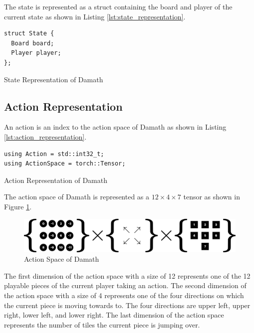 The state is represented as a struct containing the board and player of the current state as shown in Listing \ref{lst:state_representation}.

\begin{listing}[htb]
\begin{verbatim}
struct State {
  Board board;
  Player player;
};
\end{verbatim}
\caption{State Representation of Damath}
\label{lst:state_representation}
\end{listing}

\clearpage

\subsection{Action Representation}

An action is an index to the action space of Damath as shown in Listing \ref{lst:action_representation}.

\begin{listing}[htb]
\begin{verbatim}
using Action = std::int32_t;
using ActionSpace = torch::Tensor;
\end{verbatim}
\caption{Action Representation of Damath}
\label{lst:action_representation}
\end{listing}

The action space of Damath is represented as a $12 \times 4 \times 7$ tensor as shown in Figure \ref{fig:action_space}.

\begin{figure}[htb]
    \centering
    \includegraphics[width=0.7\linewidth]{images/action_space.png}
    \caption{Action Space of Damath}
    \label{fig:action_space}
\end{figure}

The first dimension of the action space with a size of 12 represents one of the 12 playable pieces of the current player taking an action. The second dimension of the action space with a size of 4 represents one of the four directions on which the current piece is moving towards to. The four directions are upper left, upper right, lower left, and lower right. The last dimension of the action space represents the number of tiles the current piece is jumping over.

